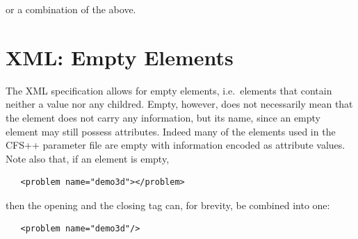 or a combination of the above.



\section{XML: Empty Elements}
%
%
The XML specification allows for empty elements, i.e.~elements that contain
neither a value nor any childred. Empty, however, does not necessarily mean
that the element does not carry any information, but its name, since an empty
element may still possess attributes. Indeed many of the elements used in the
CFS++ parameter file are empty with information encoded as attribute values.
Note also that, if an element is empty,
\begin{verbatim}
   <problem name="demo3d"></problem>
\end{verbatim}
then the opening and the closing tag can, for brevity, be combined into one:
\begin{verbatim}
   <problem name="demo3d"/>
\end{verbatim}

